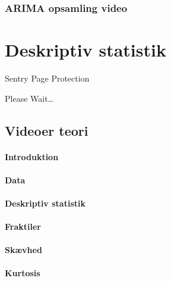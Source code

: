 \documentclass[]{book}
\begin{document}
\hypertarget{arima-opsamling-video}{%
\subsection{ARIMA opsamling video}\label{arima-opsamling-video}}

\hypertarget{deskriptiv-statistik}{%
\chapter{Deskriptiv statistik}\label{deskriptiv-statistik}}

\hypertarget{Sentry_noJS}{}
Sentry Page Protection

\hypertarget{Sentry_redirecting}{}
Please Wait\ldots{}

\hypertarget{videoer-teori}{%
\section{Videoer teori}\label{videoer-teori}}

\hypertarget{introduktion}{%
\subsubsection{Introduktion}\label{introduktion}}

\hypertarget{data}{%
\subsubsection{Data}\label{data}}

\hypertarget{deskriptiv-statistik-1}{%
\subsubsection{Deskriptiv statistik}\label{deskriptiv-statistik-1}}

\hypertarget{fraktiler}{%
\subsubsection{Fraktiler}\label{fraktiler}}

\hypertarget{skvhed}{%
\subsubsection{Skævhed}\label{skvhed}}

\hypertarget{kurtosis}{%
\subsubsection{Kurtosis}\label{kurtosis}}
\end{document}
